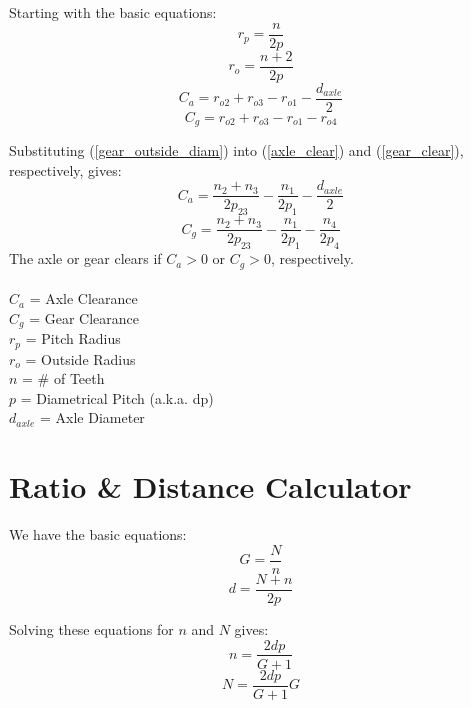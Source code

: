 \documentclass[11pt,a4paper,titlepage]{article}
\begin{document}
	Starting with the basic equations:
	\begin{equation} \label{gear_pitch_diam}
		r_p = \frac{n}{2p}
	\end{equation}
	\begin{equation} \label{gear_outside_diam}
		r_o = \frac{n+2}{2p}
	\end{equation}
	\begin{equation} \label{axle_clear}
		C_a = r_{o2} + r_{o3} - r_{o1} - \frac{d_{axle}}{2}
	\end{equation}
	\begin{equation} \label{gear_clear}
		C_g = r_{o2} + r_{o3} - r_{o1} - r_{o4}
	\end{equation}
	
	\newpage
	Substituting (\ref{gear_outside_diam}) into (\ref{axle_clear}) and (\ref{gear_clear}), respectively, gives:
	\begin{equation}
		C_a = \frac{n_2 + n_3}{2 p_{23}} - \frac{n_1}{2 p_1} - \frac{d_{axle}}{2}
	\end{equation}
	\begin{equation}
		C_g = \frac{n_2 + n_3}{2 p_{23}} - \frac{n_1}{2 p_1} - \frac{n_4}{2 p_4}
	\end{equation}
	The axle or gear clears if $C_a > 0$ or $C_g > 0$, respectively. \\ \\
	$C_a$ = Axle Clearance \\
	$C_g$ = Gear Clearance \\
	$r_p$ = Pitch Radius \\
	$r_o$ = Outside Radius \\
	$n$ = \# of Teeth \\
	$p$ = Diametrical Pitch (a.k.a. dp)\\
	$d_{axle}$ = Axle Diameter
	
	\bigskip
	\section{Ratio \& Distance Calculator}
	We have the basic equations:
	\begin{equation}
		G = \frac{N}{n}
	\end{equation}
	\begin{equation}
		d = \frac{N + n}{2 p}
	\end{equation}
	
	Solving these equations for $n$ and $N$ gives:
	\begin{equation}
		n = \frac{2 d p}{G + 1}
	\end{equation}
	\begin{equation}
		N = \frac{2 d p}{G + 1} G
	\end{equation}
	
\end{document}
